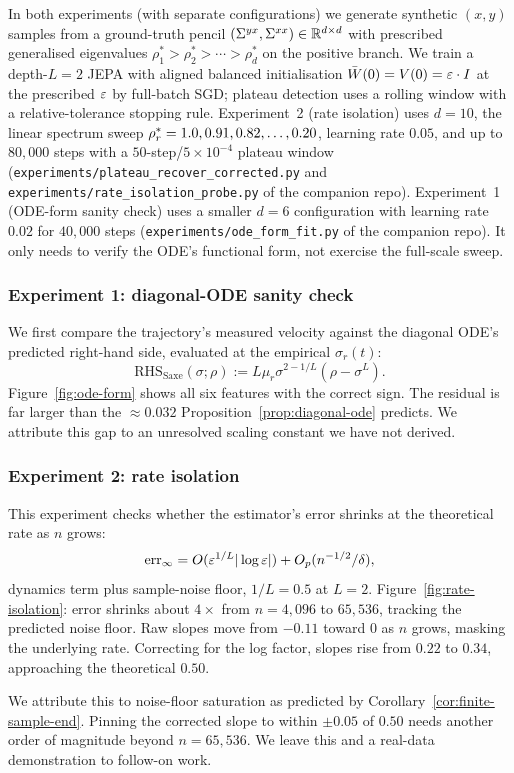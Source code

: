 In both experiments (with separate configurations) we generate synthetic $(x, y)$ samples from a
ground-truth pencil $(\Sigma^{yx}, \Sigma^{xx}) \in \mathbb{R}^{d \times d}$ with prescribed
generalised eigenvalues $\rho_1^* > \rho_2^* > \cdots > \rho_d^*$ on the
positive branch. We train a depth-$L = 2$ JEPA with aligned balanced
initialisation $\bar{W}(0) = V(0) = \varepsilon \cdot I$ at the prescribed $\varepsilon$
by full-batch SGD; plateau detection uses a rolling window with a
relative-tolerance stopping rule. Experiment~2 (rate isolation)
uses $d = 10$, the linear spectrum sweep $\rho_r^* = 1.0, 0.91, 0.82,
\ldots, 0.20$, learning rate $0.05$, and up to $80{,}000$ steps with a
$50$-step/$5 \times 10^{-4}$ plateau window
(\nolinkurl{experiments/plateau_recover_corrected.py} and
\nolinkurl{experiments/rate_isolation_probe.py} of the companion repo).
Experiment~1 (ODE-form sanity check) uses a smaller $d = 6$ configuration
with learning rate $0.02$ for $40{,}000$ steps
(\nolinkurl{experiments/ode_form_fit.py} of the companion repo). It
only needs to verify the ODE's functional form, not exercise the
full-scale sweep.

\subsubsection{Experiment 1: diagonal-ODE sanity check}
\label{ssec:exp-ode-form}

We first compare the trajectory's measured velocity against the diagonal
ODE's predicted right-hand side, evaluated at the empirical
$\sigma_r(t)$:
\[
\mathrm{RHS}_{\mathrm{Saxe}}(\sigma; \rho)
:= L \mu_r \sigma^{2-1/L} (\rho - \sigma^L).
\]
Figure~\ref{fig:ode-form} shows all six features with the correct sign.
The residual is far larger than the $\approx 0.032$
Proposition~\ref{prop:diagonal-ode} predicts. We attribute this gap to
an unresolved scaling constant we have not derived.

\subsubsection{Experiment 2: rate isolation}
\label{ssec:exp-rate}

This experiment checks whether the estimator's error shrinks at the
theoretical rate as $n$ grows:
\[
\mathrm{err}_\infty = O(\varepsilon^{1/L}|\log\varepsilon|) + O_p(n^{-1/2}/\delta),
\]
dynamics term plus sample-noise floor, $1/L = 0.5$ at $L=2$.
Figure~\ref{fig:rate-isolation}: error shrinks about $4\times$ from
$n=4{,}096$ to $65{,}536$, tracking the predicted noise floor. Raw
slopes move from $-0.11$ toward $0$ as $n$ grows, masking the underlying
rate. Correcting for the log factor, slopes rise from $0.22$ to $0.34$,
approaching the theoretical $0.50$.

We attribute this to noise-floor saturation as predicted by Corollary~\ref{cor:finite-sample-end}. Pinning the corrected slope to within
$\pm 0.05$ of $0.50$ needs another order of magnitude beyond $n=65{,}536$.
We leave this and a real-data demonstration to follow-on work.

